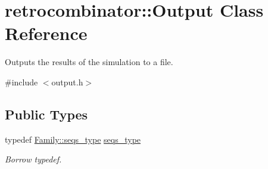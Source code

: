 \hypertarget{classretrocombinator_1_1Output}{}\section{retrocombinator\+:\+:Output Class Reference}
\label{classretrocombinator_1_1Output}


Outputs the results of the simulation to a file.  




{\ttfamily \#include $<$output.\+h$>$}

\subsection*{Public Types}
\begin{DoxyCompactItemize}
\item 
\mbox{\label{classretrocombinator_1_1Output_a2df584f5a2dbb2bf4a6789118902d83c}} 
typedef \hyperlink{classretrocombinator_1_1Family_a994b8646d1c0c4e19420d2e5c6c53c85}{Family\+::seqs\+\_\+type} \hyperlink{classretrocombinator_1_1Output_a2df584f5a2dbb2bf4a6789118902d83c}{seqs\+\_\+type}
\begin{DoxyCompactList}\small\item\em Borrow typedef. \end{DoxyCompactList}\end{DoxyCompactItemize}
